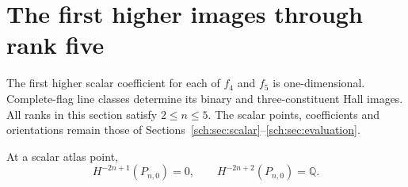 \section{The first higher images through rank five}
\label{sch:sec:first-higher}

The first higher scalar coefficient for each of $f_4$ and $f_5$
is one-dimensional. Complete-flag line classes determine its binary
and three-constituent Hall images.
All ranks in this section satisfy $2\leq n\leq5$.
The scalar points, coefficients and orientations remain those of
Sections~\ref{sch:sec:scalar}--\ref{sch:sec:evaluation}.

\begin{lemma}
\label{sch:lem:next-degrees}
At a scalar atlas point,
\[
 H^{-2n+1}(P_{n,0})=0,\qquad
 H^{-2n+2}(P_{n,0})=\mathbb Q.
\]
\end{lemma}

